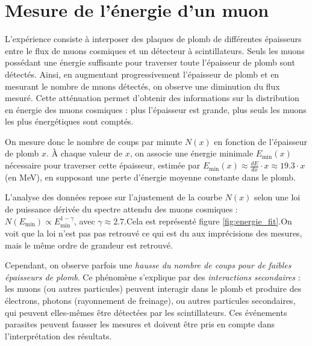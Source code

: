 \documentclass[a4paper,12pt,twoside]{article}
\begin{document}
\section{Mesure de l’énergie d’un muon}
\begin{center}
\begin{tcolorbox}[colback=blue!5!white, colframe=blue!60!black, title=Principe de la mesure de l'énergie des muons cosmiques]
L’expérience consiste à interposer des plaques de plomb de différentes épaisseurs entre le flux de muons cosmiques et un détecteur à scintillateurs. Seuls les muons possédant une énergie suffisante pour traverser toute l’épaisseur de plomb sont détectés. Ainsi, en augmentant progressivement l’épaisseur de plomb et en mesurant le nombre de muons détectés, on observe une diminution du flux mesuré. Cette atténuation permet d’obtenir des informations sur la distribution en énergie des muons cosmiques : plus l’épaisseur est grande, plus seuls les muons les plus énergétiques sont comptés.
\end{tcolorbox}
\end{center}


On mesure donc le nombre de coups par minute $N(x)$ en fonction de l’épaisseur de plomb $x$.
 À chaque valeur de $x$, on associe une énergie minimale $E_{\min}(x)$ nécessaire pour traverser cette épaisseur, estimée par $E_{\min}(x) \approx \frac{dE}{dx} \cdot x \approx 19.3 \cdot x$ (en MeV), en supposant une perte d’énergie moyenne constante dans le plomb.

L’analyse des données repose sur l’ajustement de la courbe $N(x)$ selon une loi de puissance dérivée du spectre attendu des muons cosmiques : $N(E_{\min}) \propto E_{\min}^{1 - \gamma}$, avec $\gamma \approx 2.7$.Cela est représenté figure \ref{fig:energie_fit}.On voit que la loi n'est pas pas retrouvé ce qui est du aux imprécisions des mesures, mais le même ordre de grandeur est retrouvé.

Cependant, on observe parfois une \textit{hausse du nombre de coups pour de faibles épaisseurs de plomb}. Ce phénomène s’explique par des \textit{interactions secondaires} : les muons (ou autres particules) peuvent interagir dans le plomb et produire des électrons, photons (rayonnement de freinage), ou autres particules secondaires, qui peuvent elles-mêmes être détectées par les scintillateurs. Ces événements parasites peuvent fausser les mesures et doivent être pris en compte dans l’interprétation des résultats.
\end{document}

